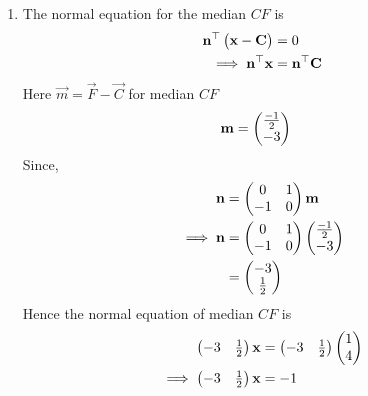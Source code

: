 \documentclass[11pt]{book}
\begin{document}
\begin{enumerate}[label=\thesection.\arabic*.,ref=\thesection.\theenumi]
\begin{enumerate}
\item The normal equation for the median $CF$ is
\begin{align}
\mathbf{n}^{\top}\begin{pmatrix}\mathbf{x}-\mathbf{C}\end{pmatrix}&=0\\
\implies
\mathbf{n}^{\top}\mathbf{x}&=\mathbf{n}^{\top}\mathbf{C}
\end{align}
Here $\vec{m} = \vec{F}- \vec{C}$ for median $CF$
\begin{align}
\mathbf{m}&=\begin{pmatrix}\frac{-1}{2}\\-3\end{pmatrix}
\end{align}
Since,
\begin{align}
  \mathbf{n} &= \begin{pmatrix}0 & 1\\
  -1 & 0\end{pmatrix}\mathbf{m}\\
\implies
\mathbf{n} &= \begin{pmatrix}0 & 1\\
  -1 & 0\end{pmatrix}\begin{pmatrix}\frac{-1}{2} \\ -3 \end{pmatrix}\\
        &= \begin{pmatrix}-3 \\ \frac{1}{2}\end{pmatrix}
\end{align}
Hence the normal equation of median $CF$ is 
\begin{align}
    \begin{pmatrix}-3 & \frac{1}{2} \end{pmatrix}\mathbf{x}&=\begin{pmatrix}-3 & \frac{1}{2}\end{pmatrix}\begin{pmatrix}1\\4\end{pmatrix}\\
\implies
    \begin{pmatrix}-3 & \frac{1}{2}\end{pmatrix}\mathbf{x}&=-1
\end{align}
\end{enumerate}


\end{enumerate}
\end{document}
